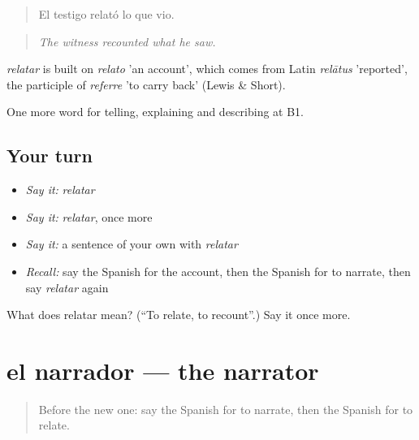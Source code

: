 \begin{quote}
El testigo relató lo que vio.
\end{quote}

\begin{quote}
\emph{The witness recounted what he saw.}
\end{quote}

\begin{cousinweb}
\emph{relatar} is built on \emph{relato} 'an account', which comes from Latin \emph{relātus} 'reported', the participle of \emph{referre} 'to carry back' (Lewis \& Short).
\end{cousinweb}

\begin{grammarlens}[title={What you've built}]
One more word for telling, explaining and describing at B1.
\end{grammarlens}

\subsection*{Your turn}
\begin{itemize}
\raggedright
  \item \emph{Say it:} \emph{relatar}
  \item \emph{Say it:} \emph{relatar}, once more
  \item \emph{Say it:} a sentence of your own with \emph{relatar}
  \item \emph{Recall:} say the Spanish for the account, then the Spanish for to narrate, then say \emph{relatar} again
\end{itemize}

\begin{tcolorbox}[breakable,colback=teal!4,colframe=teal!35!black,title={Before you move on}]
What does relatar mean? (\textquotedblleft{}To relate, to recount\textquotedblright{}.) Say it once more.
\end{tcolorbox}
\section[el narrador]{el narrador — the narrator}

\label{lesson:ES-C563-narrador}



\begin{quote}
Before the new one: say the Spanish for to narrate, then the Spanish for to relate.
\end{quote}

